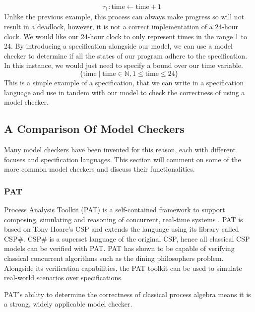 \[
\begin{aligned}
& \tau_1: \text{time} \leftarrow \text{time} + 1
\end{aligned}
\]
Unlike the previous example, this process can always make progress so will not result in a deadlock, however, it is not a correct implementation of a 24-hour clock. We would like our 24-hour clock to only represent times in the range 1 to 24. By introducing a specification alongside our model, we can use a model checker to determine if all the states of our program adhere to the specification. In this instance, we would just need to specify a bound over our time variable.
\[
\{ \text{time} \mid \text{time} \in \mathbb{N}, 1 \leq \text{time} \leq 24 \}
\]
This is a simple example of a specification, that we can write in a specification language and use in tandem with our model to check the correctness of using a model checker.
\subsection[]{A Comparison Of Model Checkers}
Many model checkers have been invented for this reason, each with different focuses and specification languages. This section will comment on some of the more common model checkers and discuss their functionalities. \\
\subsubsection*{\textbf{PAT}}
Process Analysis Toolkit (PAT) is a self-contained framework to support composing, simulating and reasoning of concurrent, real-time systems \cite{pat}. PAT is based on Tony Hoare's CSP and extends the language using its library called CSP\#. CSP\# is a superset language of the original CSP, hence all classical CSP models can be verified with PAT. PAT has shown to be capable of verifying classical concurrent algorithms such as the dining philosophers problem. Alongside its verification capabilities, the PAT toolkit can be used to simulate real-world scenarios over specifications. 
\par
PAT's ability to determine the correctness of classical process algebra means it is a strong, widely applicable model checker.

